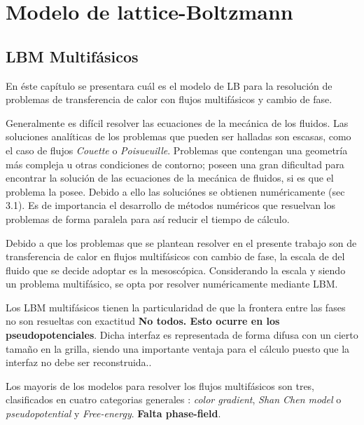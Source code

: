 ﻿\chapter{Modelo de lattice-Boltzmann}
\graphicspath{{figs/cap2/}}
\label{cap3}

\section{LBM Multifásicos}

En éste capítulo se presentara cuál es el modelo de LB para la resolución de problemas de transferencia de calor con flujos multifásicos y cambio de fase.

Generalmente es difícil resolver las ecuaciones de la mecánica de los fluidos. Las soluciones analíticas de los problemas que pueden ser halladas son escasas, como el caso de flujos \textit{Couette} o \textit{Poisueuille}. Problemas que contengan una geometría más compleja u otras condiciones de contorno; poseen una gran dificultad para encontrar la solución de las ecuaciones de la mecánica de fluidos, si es que el problema la posee. Debido a ello las soluciónes se obtienen numéricamente \cite{kruger2017lattice}(sec 3.1). Es de importancia el desarrollo de métodos numéricos que resuelvan los problemas de forma paralela para así reducir el tiempo de cálculo.

Debido a que los problemas que se plantean resolver en el presente trabajo son de transferencia de calor en flujos multifásicos con cambio de fase, la escala de del fluido que se decide adoptar es la mesoscópica. Considerando la escala y siendo un problema multifásico, se opta por resolver numéricamente mediante LBM. 

Los LBM multifásicos tienen la particularidad de que la frontera entre las fases no son resueltas con exactitud \textbf{No todos. Esto ocurre en los pseudopotenciales}. Dicha interfaz es representada de forma difusa con un cierto tamaño en la grilla, siendo una importante ventaja para el cálculo puesto que la interfaz no debe ser reconstruida.\cite{parrill2019reviews}.

Los mayoris de los modelos para resolver los flujos multifásicos son tres, clasificados en cuatro categorias generales : \textit{color gradient}, \textit{Shan Chen model} o \textit{pseudopotential} y \textit{Free-energy}. \textbf{Falta phase-field}. 

